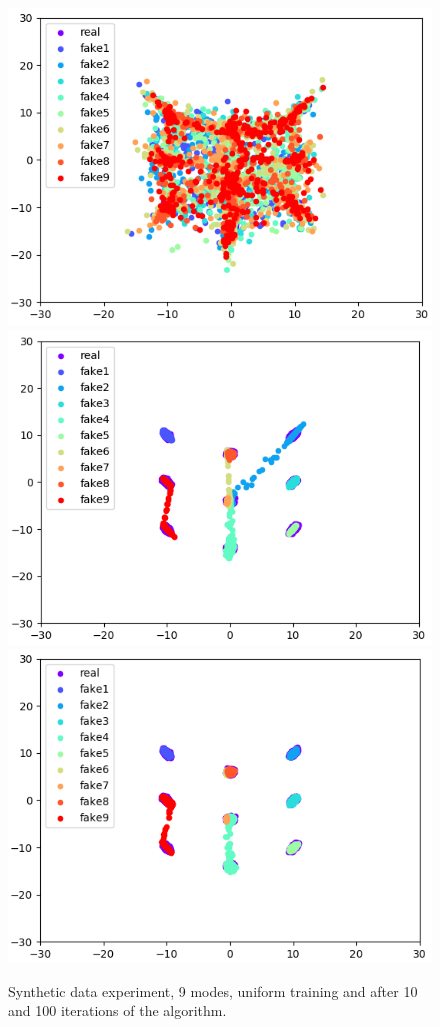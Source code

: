 \documentclass{article}
\begin{document}
\begin{figure}
\includegraphics[scale=0.31]{pics/gmm_9_0.png}
\includegraphics[scale=0.31]{pics/gmm_9_10.png}
\includegraphics[scale=0.31]{pics/gmm_9_100.png}
\caption{Synthetic data experiment, 9 modes, uniform training and after 10 and 100 iterations of the algorithm.}
\end{figure}
\end{document}
